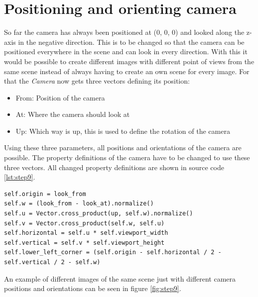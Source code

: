 \documentclass[12pt]{report}
\begin{document}
\chapter{Positioning and orienting camera}
So far the camera has always been positioned at (0, 0, 0) and looked along the z-axis in the negative direction. This is to be changed so that the camera can be positioned everywhere in the scene and can look in every direction. With this it would be possible to create different images with different point of views from the same scene instead of always having to create an own scene for every image. For that the \textit{Camera} now gets three vectors defining its position:
\begin{itemize}
\item From: Position of the camera
\item At: Where the camera should look at
\item Up: Which way is up, this is used to define the rotation of the camera
\end{itemize}
Using these three parameters, all positions and orientations of the camera are possible. The property definitions of the camera have to be changed to use these three vectors. All changed property definitions are shown in source code \ref{lst:step9}.
\begin{lstlisting}[caption={Updated camera properties}, label=lst:step9, style=mystyle]
self.origin = look_from
self.w = (look_from - look_at).normalize()
self.u = Vector.cross_product(up, self.w).normalize()
self.v = Vector.cross_product(self.w, self.u)
self.horizontal = self.u * self.viewport_width
self.vertical = self.v * self.viewport_height
self.lower_left_corner = (self.origin - self.horizontal / 2 - self.vertical / 2 - self.w)
\end{lstlisting}
An example of different images of the same scene just with different camera positions and orientations can be seen in figure \ref{fig:step9}.
\end{document}
